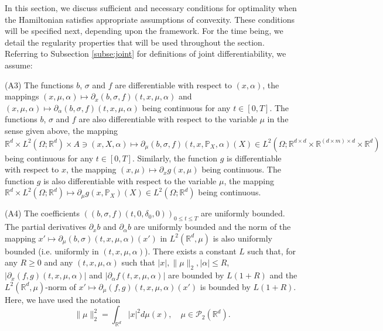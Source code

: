 \documentclass[11pt]{amsart}
\begin{document}
In this section, we discuss sufficient and necessary conditions for optimality
when the Hamiltonian satisfies appropriate assumptions of convexity. These conditions will be specified next, 
depending upon the framework. For the time being, we detail the regularity properties that will be used throughout the section. 
 Referring to Subsection \ref{subse:joint} for definitions of joint differentiability, we assume:
\vspace{5pt}

(A3) The functions $b$, $\sigma$ and 
$f$ are differentiable with respect to $(x,\alpha)$, the mappings $(x,\mu,\alpha) \mapsto 
\partial_{x} (b,\sigma,f) (t,x,\mu,\alpha)$ and $(x,\mu,\alpha) \mapsto 
\partial_{\alpha} (b,\sigma,f) (t,x,\mu,\alpha)$ being continuous for any $t \in [0,T]$. The functions $b$, $\sigma$ and $f$ are also differentiable with respect to the variable $\mu$ in the sense given above, the mapping 
${\mathbb R}^d \times 
L^2(\Omega;{\mathbb R}^d) 
\times A \ni (x,X,\alpha) \mapsto \partial_{\mu} (b,\sigma,f)(t,x,{\mathbb P}_{X},\alpha)(X) \in L^2(\Omega;{\mathbb R}^{d \times d} \times {\mathbb R}^{(d \times m) \times d} \times {\mathbb R}^d)$ being continuous for any 
$t \in [0,T]$. Similarly, the function $g$ is differentiable with respect to $x$, the mapping 
$(x,\mu) \mapsto \partial_{x} g(x,\mu)$ being continuous. The function $g$ is also differentiable with respect to the variable $\mu$, the mapping ${\mathbb R}^d \times L^2(\Omega;{\mathbb R}^d) \mapsto \partial_{\mu} g(x,{\mathbb P}_{X})(X) \in L^2(\Omega;{\mathbb R}^d)$ being continuous.
\vspace{2pt}

(A4) The coefficients $((b,\sigma,f)(t,0,\delta_{0},0))_{0 \leq t \leq T}$ are uniformly bounded. 
The partial derivatives $\partial_{x} b$ and $\partial_{\alpha} b$ are uniformly bounded and the norm of the mapping $x' \mapsto
\partial_{\mu}(b,\sigma)(t,x,\mu,\alpha)(x')$ in $L^2({\mathbb R}^d,\mu)$ 
is also uniformly bounded (i.e. uniformly in $(t,x,\mu,\alpha)$). There exists a constant $L$ such that, for any $R \geq 0$ and any 
$(t,x,\mu,\alpha)$ such that $\vert x \vert,\| \mu \|_{2},\vert \alpha \vert \leq R$, $\vert \partial_{x} (f,g)(t,x,\mu,\alpha) \vert$ 
and $\vert \partial_{\alpha} f(t,x,\mu,\alpha) \vert$ are bounded by $L(1+R)$ and the $L^2({\mathbb R}^d,\mu)$-norm of 
$x' \mapsto
\partial_{\mu}(f,g)(t,x,\mu,\alpha)(x')$ is bounded by $L(1+R)$. Here, we have used the notation
\begin{equation*}
\| \mu \|_{2}^2 = \int_{{\mathbb R}^d} \vert x\vert^2 d\mu(x), \quad \mu \in {\mathcal P}_{2}({\mathbb R}^d). 
\end{equation*}
\end{document}
